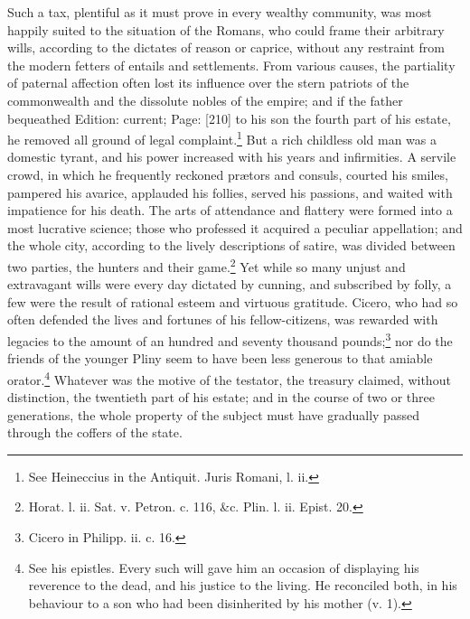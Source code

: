 Such a tax, plentiful as it must prove in every wealthy community, was most happily suited to the situation of the Romans, who could frame their arbitrary wills, according to the dictates of reason or caprice, without any restraint from the modern fetters of entails and settlements. From various causes, the partiality of paternal affection often lost its influence over the stern patriots of the commonwealth and the dissolute nobles of the empire; and if the father bequeathed Edition: current; Page: [210] to his son the fourth part of his estate, he removed all ground of legal complaint.\footnote{See Heineccius in the Antiquit. Juris Romani, l. ii.} But a rich childless old man was a domestic tyrant, and his power increased with his years and infirmities. A servile crowd, in which he frequently reckoned prætors and consuls, courted his smiles, pampered his avarice, applauded his follies, served his passions, and waited with impatience for his death. The arts of attendance and flattery were formed into a most lucrative science; those who professed it acquired a peculiar appellation; and the whole city, according to the lively descriptions of satire, was divided between two parties, the hunters and their game.\footnote{Horat. l. ii. Sat. v. Petron. c. 116, \&c. Plin. l. ii. Epist. 20.} Yet while so many unjust and extravagant wills were every day dictated by cunning, and subscribed by folly, a few were the result of rational esteem and virtuous gratitude. Cicero, who had so often defended the lives and fortunes of his fellow-citizens, was rewarded with legacies to the amount of an hundred and seventy thousand pounds;\footnote{Cicero in Philipp. ii. c. 16.} nor do the friends of the younger Pliny seem to have been less generous to that amiable orator.\footnote{See his epistles. Every such will gave him an occasion of displaying his reverence to the dead, and his justice to the living. He reconciled both, in his behaviour to a son who had been disinherited by his mother (v. 1).} Whatever was the motive of the testator, the treasury claimed, without distinction, the twentieth part of his estate; and in the course of two or three generations, the whole property of the subject must have gradually passed through the coffers of the state.

